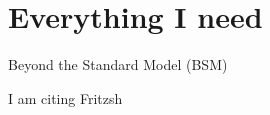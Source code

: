 \chapter*{Everything I need}
Beyond the Standard Model (\acs{BSM})

I am citing Fritzsh \cite{Fritzsh}


